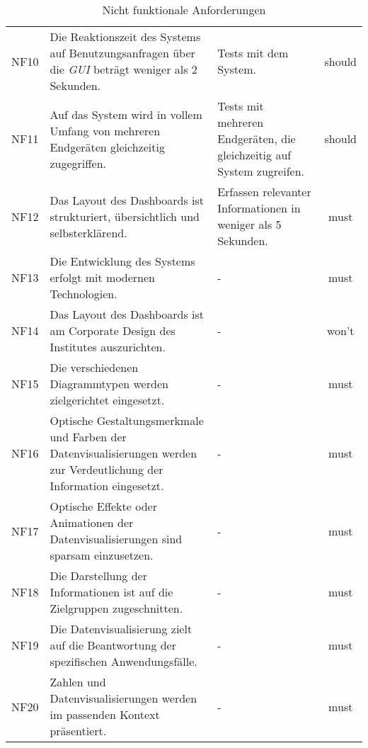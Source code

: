 \begin{table}[H]
\begin{adjustbox}{max width=\textwidth}
\begin{tabular}{lp{7.5cm}p{7.5cm}c}
        NF10                              &Die Reaktionszeit des Systems auf Benutzungsanfragen über die \textit{\acrshort{GUI}} beträgt weniger als 2 Sekunden. & Tests mit dem System.& should\\
        NF11                              &Auf das System wird in vollem Umfang von mehreren Endgeräten gleichzeitig zugegriffen. & Tests mit mehreren Endgeräten, die gleichzeitig auf System zugreifen.& should\\
        NF12                              &Das Layout des Dashboards ist strukturiert, übersichtlich und selbsterklärend. & Erfassen relevanter Informationen in weniger als 5 Sekunden.& must\\
        NF13                              &Die Entwicklung des Systems erfolgt mit modernen Technologien. & - & must\\
        NF14                              &Das Layout des Dashboards ist am Corporate Design des Institutes auszurichten. & -& won't\\
        NF15                              &Die verschiedenen Diagrammtypen werden zielgerichtet eingesetzt. & -& must\\
        NF16                              &Optische Gestaltungsmerkmale und Farben der Datenvisualisierungen werden zur Verdeutlichung der Information eingesetzt. &- & must\\
        NF17                              &Optische Effekte oder Animationen der Datenvisualisierungen sind sparsam einzusetzen. & -& must\\
        NF18                              &Die Darstellung der Informationen ist auf die Zielgruppen zugeschnitten. & -& must\\
        NF19                              &Die Datenvisualisierung zielt auf die Beantwortung der spezifischen Anwendungsfälle. & -& must\\
        NF20                              &Zahlen und Datenvisualisierungen werden im passenden Kontext präsentiert. & -& must\\
       \bottomrule
    \end{tabular}
    \end{adjustbox}
    \caption{%
        Nicht funktionale Anforderungen
    }
    \label{tab: nfAnforderungen}
    \end{table}
\endgroup
